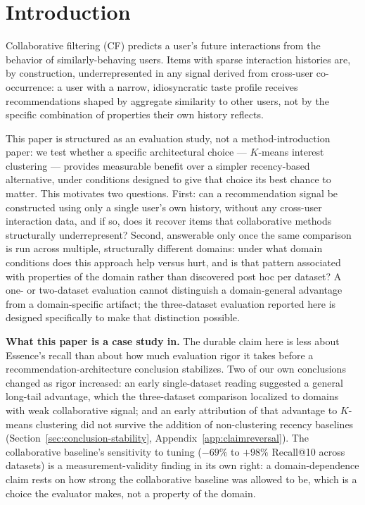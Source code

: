 \documentclass{article}
\begin{document}
\section{Introduction}
\label{sec:intro}

Collaborative filtering (CF) predicts a user's future interactions from the behavior of similarly-behaving users. Items with sparse interaction histories are, by construction, underrepresented in any signal derived from cross-user co-occurrence: a user with a narrow, idiosyncratic taste profile receives recommendations shaped by aggregate similarity to other users, not by the specific combination of properties their own history reflects.

This paper is structured as an evaluation study, not a method-introduction paper: we test whether a specific architectural choice --- $K$-means interest clustering --- provides measurable benefit over a simpler recency-based alternative, under conditions designed to give that choice its best chance to matter. This motivates two questions. First: can a recommendation signal be constructed using only a single user's own history, without any cross-user interaction data, and if so, does it recover items that collaborative methods structurally underrepresent? Second, answerable only once the same comparison is run across multiple, structurally different domains: under what domain conditions does this approach help versus hurt, and is that pattern associated with properties of the domain rather than discovered post hoc per dataset? A one- or two-dataset evaluation cannot distinguish a domain-general advantage from a domain-specific artifact; the three-dataset evaluation reported here is designed specifically to make that distinction possible.

\textbf{What this paper is a case study in.} The durable claim here is less about Essence's recall than about how much evaluation rigor it takes before a recommendation-architecture conclusion stabilizes. Two of our own conclusions changed as rigor increased: an early single-dataset reading suggested a general long-tail advantage, which the three-dataset comparison localized to domains with weak collaborative signal; and an early attribution of that advantage to $K$-means clustering did not survive the addition of non-clustering recency baselines (Section~\ref{sec:conclusion-stability}, Appendix~\ref{app:claimreversal}). The collaborative baseline's sensitivity to tuning ($-69\%$ to $+98\%$ Recall@10 across datasets) is a measurement-validity finding in its own right: a domain-dependence claim rests on how strong the collaborative baseline was allowed to be, which is a choice the evaluator makes, not a property of the domain.
\end{document}
